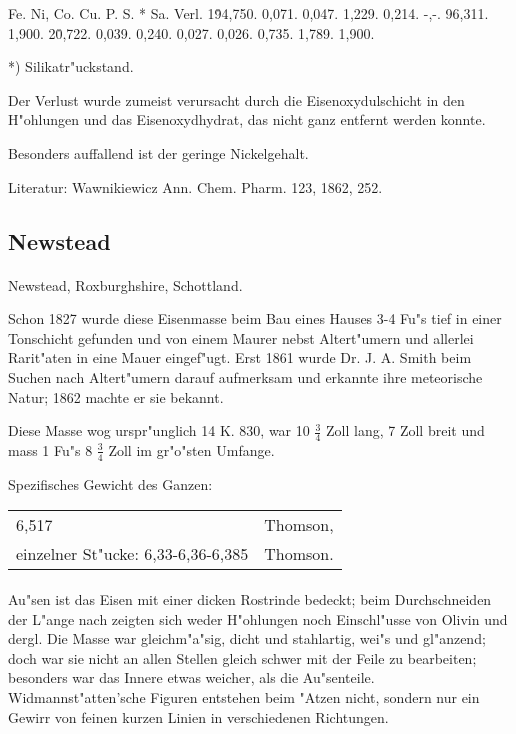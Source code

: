 \documentclass[a4paper, 11pt, oneside]{article}
\begin{document}
Fe. Ni, Co. Cu. P. S. * Sa. Verl.  
1\. 94,750. 0,071. 0,047. 1,229. 0,214. -,-. 96,311. 1,900.  
2\. 0,722. 0,039. 0,240. 0,027. 0,026. 0,735. 1,789. 1,900.

*) Silikatr"uckstand.

Der Verlust wurde zumeist verursacht durch die Eisenoxydulschicht in den H"ohlungen und das Eisenoxydhydrat, das nicht ganz entfernt werden konnte.

Besonders auffallend ist der geringe Nickelgehalt.

Literatur: Wawnikiewicz Ann. Chem. Pharm. 123, 1862, 252.

\subsection{Newstead}
\normalsize
\paragraph{}
Newstead, Roxburghshire, Schottland.

Schon 1827 wurde diese Eisenmasse beim Bau eines Hauses 3-4 Fu"s tief in einer Tonschicht gefunden und von einem Maurer nebst Altert"umern und allerlei Rarit"aten in eine Mauer eingef"ugt. Erst 1861 wurde Dr. J. A. Smith beim Suchen nach Altert"umern darauf aufmerksam und erkannte ihre meteorische Natur; 1862 machte er sie bekannt.

Diese Masse wog urspr"unglich 14 K. 830, war 10 $\frac{3}{4}$ Zoll lang, 7 Zoll breit und mass 1 Fu"s 8 $\frac{3}{4}$ Zoll im gr"o"sten Umfange.

Spezifisches Gewicht des Ganzen:
\begin{table}[!ht]
    \centering
    \begin{tabular}{l l}
        6,517 & Thomson,\\
        einzelner St"ucke: 6,33-6,36-6,385 & Thomson.
    \end{tabular}
\end{table}
\paragraph{}
Au"sen ist das Eisen mit einer dicken Rostrinde bedeckt; beim Durchschneiden der L"ange nach zeigten sich weder H"ohlungen noch Einschl"usse von Olivin und dergl. Die Masse war gleichm"a"sig, dicht und stahlartig, wei"s und gl"anzend; doch war sie nicht an allen Stellen gleich schwer mit der Feile zu bearbeiten; besonders war das Innere etwas weicher, als die Au"senteile. Widmannst"atten'sche Figuren entstehen beim "Atzen nicht, sondern nur ein Gewirr von feinen kurzen Linien in verschiedenen Richtungen.
\end{document}
